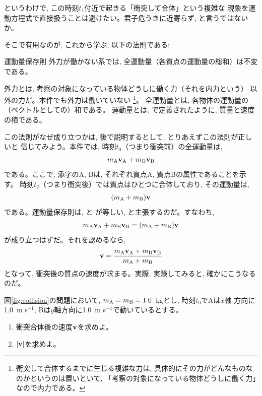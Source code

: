 というわけで, この時刻$t_1$付近で起きる「衝突して合体」という複雑な
現象を運動方程式で直接扱うことは避けたい。君子危うきに近寄らず, 
と言うではないか。\mv

そこで有用なのが, これから学ぶ, 以下の法則である:
\begin{itembox}{運動量保存則}
外力が働かない系では, 全運動量（各質点の運動量の総和）は不変である。
\end{itembox}
外力とは, 考察の対象になっている物体どうしに働く力（それを内力という）
以外の力だ。本件でも外力は働いていない
\footnote{衝突して合体するまでに生じる複雑な力は, 
具体的にその力がどんなものなのかというのは置いといて, 
「考察の対象になっている物体どうしに働く力」なので内力である。}。
全運動量とは, 各物体の運動量の（ベクトルとしての）和である。
運動量とは, で定義されたように, 質量と速度の積である。

この法則がなぜ成り立つかは, 後で説明するとして, とりあえずこの法則が正しいと
信じてみよう。本件では, 時刻$t_0$（つまり衝突前）の全運動量は, 
\begin{eqnarray} 
m_{\text A}{\bf v}_{\text A}+m_{\text B}{\bf v}_{\text B}\label{eq:momentum_mAmB_0}
\end{eqnarray} 
である。ここで, 添字のA, Bは, それぞれ質点A, 質点Bの属性であることを示す。
時刻$t_2$（つまり衝突後）では質点はひとつに合体しており, その運動量は, 
\begin{eqnarray} 
(m_{\text A}+m_{\text B}){\bf v}\label{eq:momentum_mAmB_1}
\end{eqnarray} 
である。運動量保存則は, と
が等しい, と主張するのだ。すなわち, 
\begin{eqnarray} 
m_{\text A}{\bf v}_{\text A}+m_{\text B}{\bf v}_{\text B}=(m_{\text A}+m_{\text B}){\bf v}
\end{eqnarray} 
が成り立つはずだ。それを認めるなら, 
\begin{eqnarray} 
{\bf v}=\frac{m_{\text A}{\bf v}_{\text A}+m_{\text B}{\bf v}_{\text B}}{m_{\text A}+m_{\text B}}\label{eq:2body_adhere}
\end{eqnarray} 
となって, 衝突後の質点の速度が求まる。実際, 実験してみると, 確かにこうなるのだ。\mv

%
\begin{q}\label{q:collision0}
図\ref{fig:collision}の問題において, $m_{\text A}=m_{\text B}=1.0$~kgとし, 時刻$t_0$でAは$x$軸
方向に1.0~m s$^{-1}$, Bは$y$軸方向に1.0~m s$^{-1}$で動いているとする。
\begin{enumerate}
\item 衝突合体後の速度${\bf v}$を求めよ。
\item $|{\bf v}|$を求めよ。
\end{enumerate}
\end{q}\mv

